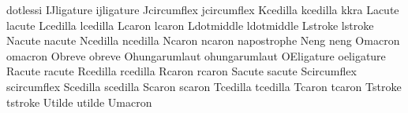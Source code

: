  dotlessi      {}
 IJligature    {}
 ijligature    {}
 Jcircumflex   {}
 jcircumflex   {}
 Kcedilla      {}
 kcedilla      {}
 kkra          {}
 Lacute        {}
 lacute        {}
 Lcedilla      {}
 lcedilla      {}
 Lcaron        {}
 lcaron        {}
 Ldotmiddle    {}
 ldotmiddle    {}
 Lstroke       {}
 lstroke       {}
 Nacute        {}
 nacute        {}
 Ncedilla      {}
 ncedilla      {}
 Ncaron        {}
 ncaron        {}
 napostrophe   {}
 Neng          {}
 neng          {}
 Omacron       {}
 omacron       {}
 Obreve        {}
 obreve        {}
 Ohungarumlaut {}
 ohungarumlaut {}
 OEligature    {}
 oeligature    {}
 Racute        {}
 racute        {}
 Rcedilla      {}
 rcedilla      {}
 Rcaron        {}
 rcaron        {}
 Sacute        {}
 sacute        {}
 Scircumflex   {}
 scircumflex   {}
 Scedilla      {}
 scedilla      {}
 Scaron        {}
 scaron        {}
 Tcedilla      {}
 tcedilla      {}
 Tcaron        {}
 tcaron        {}
 Tstroke       {}
 tstroke       {}
 Utilde        {}
 utilde        {}
 Umacron       {}
